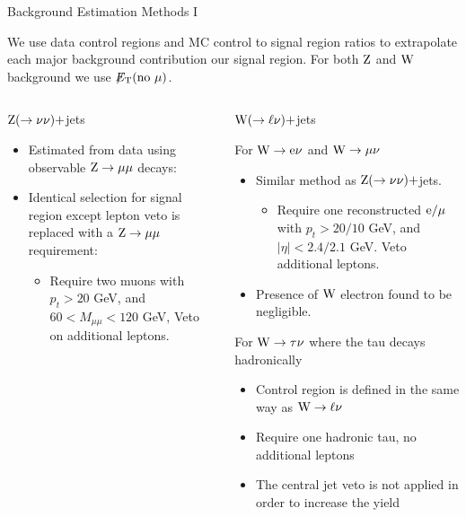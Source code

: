 \documentclass[8pt]{beamer}
\newcommand\Fontvi{\fontsize{6}{7.2}\selectfont}
\newcommand{\met}{\displaystyle{\not} E_{\rm T}}
\newcommand{\W}{{\rm W}}
\newcommand{\Z}{{\rm Z}}
\begin{document}
\begin{frame}{Background Estimation Methods I}
\Fontvi 

\begin{block}
 
We use data control regions and MC control to signal region ratios to extrapolate each major background contribution our signal region. For both $\Z$ and $\W$ background we use $\met(\text{no }\mu)$.

\end{block}

\begin{columns}  
\begin{block}{$\Z (\rightarrow \nu \nu)+$jets}


\begin{itemize}
 \item Estimated from data using observable $\Z \rightarrow \mu \mu$ decays:
 \item Identical selection for signal region except lepton veto is replaced with a $\Z \rightarrow \mu \mu$ requirement:
 \begin{itemize}
  \item {\Fontvi Require two muons with $p_t > 20 $ GeV, and $60 < M_{\mu\mu}<120$ GeV, Veto on additional leptons.}
 \end{itemize}
\end{itemize}

\end{block}

\begin{block}{$\W (\rightarrow \ell \nu)+$jets}

For $\W \rightarrow {\rm e} \nu$ and $\W \rightarrow \mu \nu$ 
\begin{itemize}
 \item Similar method as $\Z (\rightarrow \nu \nu)+$jets.
 \begin{itemize}
  \item {\Fontvi  Require one reconstructed ${\rm e}/\mu$ with $p_t > 20/10 $ GeV, and $|\eta| < 2.4/2.1$ GeV. Veto additional leptons.}
 \end{itemize}
 \item Presence of $\W$ electron found to be negligible.
\end{itemize}

For $\W \rightarrow \tau\nu$ where the tau decays hadronically
\begin{itemize}
 \item Control region is defined in the same way as $\W \rightarrow \ell \nu$
 \item Require one hadronic tau, no additional leptons
 \item The central jet veto is not applied in order to increase the yield
\end{itemize}


\end{block}
\end{columns}
\end{frame}
\end{document}
